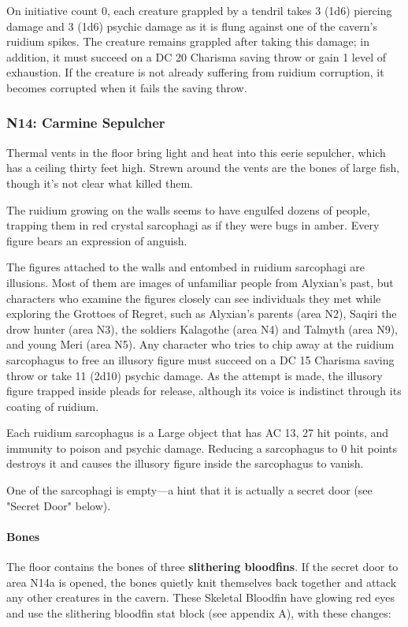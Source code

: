 \documentclass[10pt,a4paper,twoside,bg=print,twocolumn,openany,nodeprecatedcode]{dndbook}
\begin{document}
On initiative count 0, each creature grappled by a tendril takes 3 (1d6) piercing damage and 3 (1d6) psychic damage as it is flung against one of the cavern's ruidium spikes. The creature remains grappled after taking this damage; in addition, it must succeed on a DC 20 Charisma saving throw or gain 1 level of exhaustion. If the creature is not already suffering from ruidium corruption, it becomes corrupted when it fails the saving throw.

\subsubsection{N14: Carmine Sepulcher}
\begin{DndReadAloud}{}
Thermal vents in the floor bring light and heat into this eerie sepulcher, which has a ceiling thirty feet high. Strewn around the vents are the bones of large fish, though it's not clear what killed them.

The ruidium growing on the walls seems to have engulfed dozens of people, trapping them in red crystal sarcophagi as if they were bugs in amber. Every figure bears an expression of anguish.

\end{DndReadAloud}

The figures attached to the walls and entombed in ruidium sarcophagi are illusions. Most of them are images of unfamiliar people from Alyxian's past, but characters who examine the figures closely can see individuals they met while exploring the Grottoes of Regret, such as Alyxian's parents (area N2), Saqiri the drow hunter (area N3), the soldiers Kalagothe (area N4) and Talmyth (area N9), and young Meri (area N5). Any character who tries to chip away at the ruidium sarcophagus to free an illusory figure must succeed on a DC 15 Charisma saving throw or take 11 (2d10) psychic damage. As the attempt is made, the illusory figure trapped inside pleads for release, although its voice is indistinct through its coating of ruidium.

Each ruidium sarcophagus is a Large object that has AC 13, 27 hit points, and immunity to poison and psychic damage. Reducing a sarcophagus to 0 hit points destroys it and causes the illusory figure inside the sarcophagus to vanish.

One of the sarcophagi is empty—a hint that it is actually a secret door (see "Secret Door" below).

\paragraph{Bones}
The floor contains the bones of three \textbf{slithering bloodfins}. If the secret door to area N14a is opened, the bones quietly knit themselves back together and attack any other creatures in the cavern. These Skeletal Bloodfin have glowing red eyes and use the slithering bloodfin stat block (see appendix A), with these changes:
\end{document}
